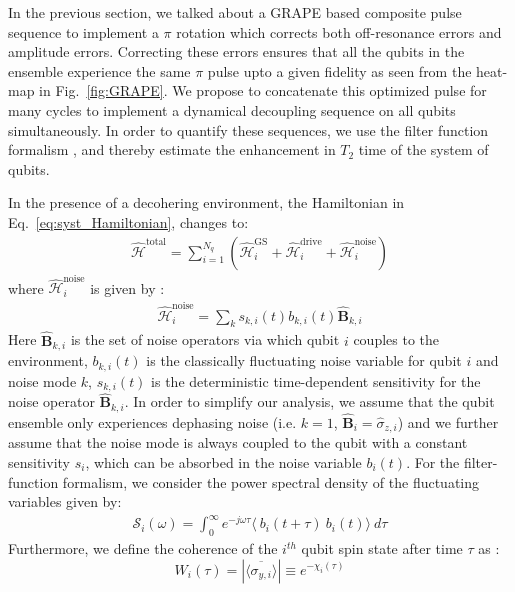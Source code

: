 \documentclass[%
 reprint,
 superscriptaddress,
 amsmath,amssymb,
 aps,
 prx,
]{revtex4-2}
\begin{document}
In the previous section, we talked about a GRAPE based composite pulse sequence to implement a $\pi$ rotation which corrects both off-resonance errors and amplitude errors. Correcting these errors ensures that all the qubits in the ensemble experience the same $\pi$ pulse upto a given fidelity as seen from the heat-map in Fig.~\ref{fig:GRAPE}. We propose to concatenate this optimized pulse for many cycles to implement a dynamical decoupling sequence on all qubits simultaneously. In order to quantify these sequences, we use the filter function formalism \cite{Biercuk_2011}, and thereby estimate the enhancement in $T_{2}$ time of the system of qubits.

In the presence of a decohering environment, the Hamiltonian in Eq.~\ref{eq:syst_Hamiltonian}, changes to:
\begin{align}
    \hat{\mathcal{H}}^{\text{total}} = \sum_{i=1}^{N_q} \left(\hat{\mathcal{H}}_i^{\text{GS}} + \hat{\mathcal{H}}_i^{\text{drive}} + \hat{\mathcal{H}}_i^{\text{noise}}\right)
\end{align}
where $\hat{\mathcal{H}}_i^{\text{noise}}$ is given by \cite{Hangleiter_2021, Cerfontaine_2021}:
\begin{align}
    \hat{\mathcal{H}}_i^{\text{noise}} = \sum_{k}s_{k,i}(t)b_{k,i}(t)\hat{\mathbf{B}}_{k,i}
\end{align}
Here $\hat{\mathbf{B}}_{k,i}$ is the set of noise operators via which qubit $i$ couples to the environment, $b_{k,i}(t)$ is the classically fluctuating noise variable for qubit $i$ and noise mode $k$, $s_{k,i}(t)$ is the deterministic time-dependent sensitivity for the noise operator $\hat{\mathbf{B}}_{k,i}$.
In order to simplify our analysis, we assume that the qubit ensemble only experiences dephasing noise (i.e. $k=1$, $\hat{\mathbf{B}}_{i}=\hat{\sigma}_{z,i}$) and we further assume that the noise mode is always coupled to the qubit with a constant sensitivity $s_{i}$, which can be absorbed in the noise variable $b_{i}(t)$. For the filter-function formalism, we consider the power spectral density of the fluctuating variables given by:
 \begin{align}
     \mathcal{S}_{i}(\omega) = \int_{0}^{\infty}e^{-j\omega\tau}\langle~b_{i}(t+\tau)~b_{i}(t)\rangle~d\tau
 \end{align}
 Furthermore, we define the coherence of the $i^{th}$ qubit spin state after time $\tau$ as \cite{Biercuk_2011}:
 \begin{equation}
     W_{i}(\tau) = |\overline{\langle\sigma_{y,i}\rangle}| \equiv e^{-\chi_{i}(\tau)}
 \end{equation}
\end{document}
